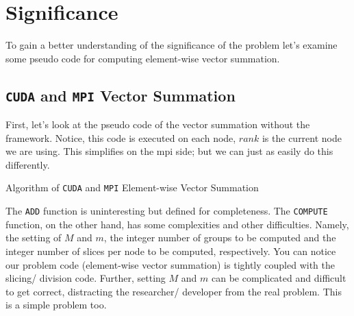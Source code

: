 \section{Significance}

To gain a better understanding of the significance of the problem let's examine
some pseudo code for computing element-wise vector summation.

\subsection{\texttt{CUDA} and \texttt{MPI} Vector Summation}

First, let's look at the pseudo code of the vector summation without the
framework. Notice, this code is executed on each node, $rank$ is the current
node we are using. This simplifies  on the \gls{mpi} side; but we can just as
easily do this differently.

\begin{algorithm}
\begin{algorithmic}
\EndFunction{}
    \EndFor{}
\EndFunction{}
\end{algorithmic}
\caption{Algorithm of \texttt{CUDA} and \texttt{MPI} Element-wise Vector
Summation}
\label{alg:cuda_mpi_vsum}
\end{algorithm}

The \texttt{ADD} function is uninteresting but defined for completeness. The
\texttt{COMPUTE} function, on the other hand, has some complexities and other
difficulties. Namely, the setting of $M$ and $m$, the integer number of groups
to be computed and the integer number of slices per node to be computed,
respectively. You can notice our problem code (element-wise vector summation)
is tightly coupled with the slicing/ division code. Further, setting $M$ and
$m$ can be complicated and difficult to get correct, distracting the
researcher/ developer from the real problem. This is a simple problem too.

